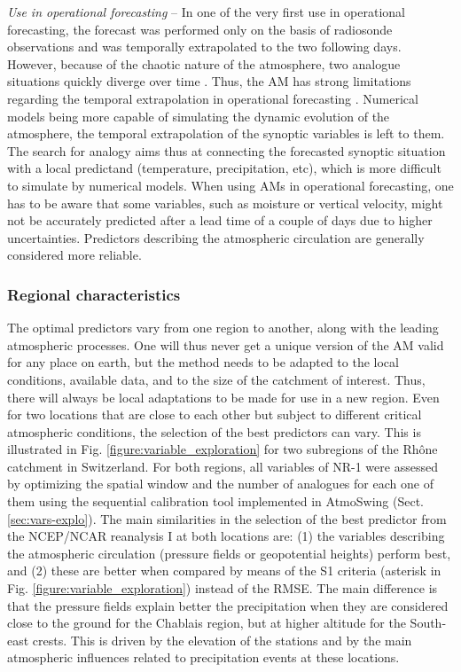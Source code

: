 \documentclass[review]{elsarticle}
\begin{document}
\textit{Use in operational forecasting} -- In one of the very first use in operational forecasting, the forecast was performed only on the basis of radiosonde observations and was temporally extrapolated to the two following days. However, because of the chaotic nature of the atmosphere, two analogue situations quickly diverge over time \citep{Lorenz1969}. Thus, the AM has strong limitations regarding the temporal extrapolation in operational forecasting \citep{Bontron2004}. Numerical models being more capable of simulating the dynamic evolution of the atmosphere, the temporal extrapolation of the synoptic variables is left to them. The search for analogy aims thus at connecting the forecasted synoptic situation with a local predictand (temperature, precipitation, etc), which is more difficult to simulate by numerical models. When using AMs in operational forecasting, one has to be aware that some variables, such as moisture or vertical velocity, might not be accurately predicted after a lead time of a couple of days due to higher uncertainties. Predictors describing the atmospheric circulation are generally considered more reliable.


\subsubsection{Regional characteristics}

The optimal predictors vary from one region to another, along with the leading atmospheric processes. One will thus never get a unique version of the AM valid for any place on earth, but the method needs to be adapted to the local conditions, available data, and to the size of the catchment of interest. Thus, there will always be local adaptations to be made for use in a new region. Even for two locations that are close to each other but subject to different critical atmospheric conditions, the selection of the best predictors can vary. This is illustrated in Fig. \ref{figure:variable_exploration} for two subregions of the Rh\^{o}ne catchment in Switzerland. For both regions, all variables of NR-1 were assessed by optimizing the spatial window and the number of analogues for each one of them using the sequential calibration tool implemented in AtmoSwing (Sect. \ref{sec:vars-explo}). The main similarities in the selection of the best predictor from the NCEP/NCAR reanalysis I at both locations are: (1) the variables describing the atmospheric circulation (pressure fields or geopotential heights) perform best, and (2) these are better when compared by means of the S1 criteria (asterisk in Fig. \ref{figure:variable_exploration}) instead of the RMSE. The main difference is that the pressure fields explain better the precipitation when they are considered close to the ground for the Chablais region, but at higher altitude for the South-east crests. This is driven by the elevation of the stations and by the main atmospheric influences related to precipitation events at these locations. 
\end{document}
